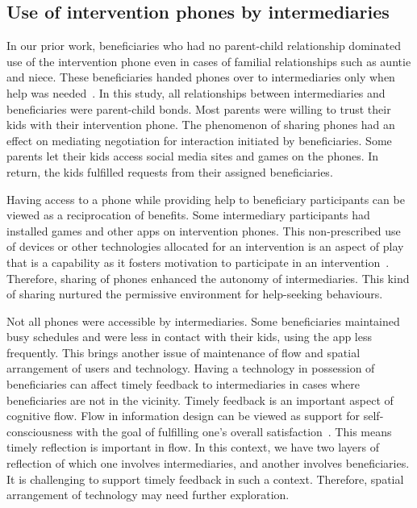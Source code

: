 \documentclass{sig-alternate}
\begin{document}
\subsection*{\textbf{Use of intervention phones by intermediaries}}
In our prior work, beneficiaries who had no parent-child relationship dominated use of the intervention phone even in cases of familial relationships such as auntie and niece. These beneficiaries handed phones over to intermediaries only when help was needed~\cite{katule2016:leveraging}. In this study, all relationships between intermediaries and beneficiaries were parent-child bonds. Most parents were willing to trust their kids with their intervention phone. The phenomenon of sharing phones had an effect on mediating negotiation for interaction initiated by beneficiaries. Some parents let their kids access social media sites and games on the phones. In return, the kids fulfilled requests from their assigned beneficiaries.

Having access to a phone while providing help to beneficiary participants can be viewed as a reciprocation of benefits. Some intermediary participants had installed games and other apps on intervention phones. This non-prescribed use of devices or other technologies allocated for an intervention is an aspect of play that is a capability as it fosters motivation to participate in an intervention~\cite{Schwartz2013,ferr2015:play}. Therefore, sharing of phones enhanced the autonomy of intermediaries. This kind of sharing nurtured the permissive environment for help-seeking behaviours.  

Not all phones were accessible by intermediaries. Some beneficiaries maintained busy schedules and were less in contact with their kids, using the app less frequently. This brings another issue of maintenance of flow and spatial arrangement of users and technology. Having a technology in possession of beneficiaries can affect timely feedback to intermediaries in cases where beneficiaries are not in the vicinity. Timely feedback is an important aspect of cognitive flow. Flow in information design can be viewed as support for self-consciousness with the goal of fulfilling one's overall satisfaction~\cite{csikszentmihalyiflow}. This means timely reflection is important in flow. In this context, we have two layers of reflection of which one involves intermediaries, and another involves beneficiaries. It is challenging to support timely feedback in such a context. Therefore, spatial arrangement of technology may need further exploration.
\end{document}
